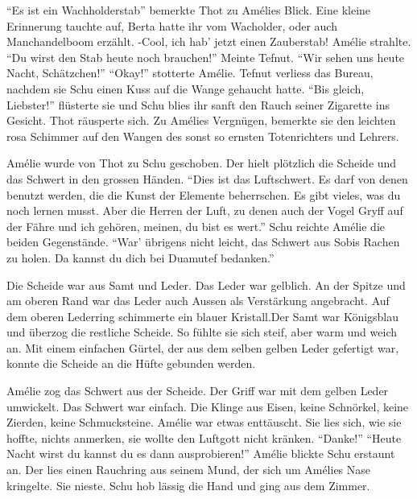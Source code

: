 \documentclass[11pt,titlepage,a5paper]{book}
\begin{document}
 "`Es ist ein Wachholderstab"' bemerkte Thot zu Amélies Blick. Eine kleine Erinnerung tauchte auf, Berta hatte ihr vom Wacholder, oder auch Manchandelboom erzählt. -Cool, ich hab' jetzt einen Zauberstab! Amélie strahlte. "`Du wirst den Stab heute noch brauchen!"' Meinte Tefnut. "`Wir sehen uns heute Nacht, Schätzchen!"' "`Okay!"' stotterte Amélie. Tefnut verliess das Bureau, nachdem sie Schu einen Kuss auf die Wange gehaucht hatte. "`Bis gleich, Liebster!"' flüsterte sie und Schu blies ihr sanft den Rauch seiner Zigarette ins Gesicht. Thot räusperte sich. Zu Amélies Vergnügen, bemerkte sie den leichten rosa Schimmer auf den Wangen des sonst so ernsten Totenrichters und Lehrers.

Amélie wurde von Thot zu Schu geschoben. Der hielt plötzlich die Scheide und das Schwert in den grossen Händen. "`Dies ist das Luftschwert. Es darf von denen benutzt werden, die die Kunst der Elemente beherrschen. Es gibt vieles, was du noch lernen musst. Aber die Herren der Luft, zu denen auch der Vogel Gryff auf der Fähre und ich gehören, meinen, du bist es wert."' Schu reichte Amélie die beiden Gegenstände. "`War' übrigens nicht leicht, das Schwert aus Sobis Rachen zu holen. Da kannst du dich bei Duamutef bedanken."'

Die Scheide war aus Samt und Leder. Das Leder war gelblich. An der Spitze und am oberen Rand war das Leder auch Aussen als Verstärkung angebracht. Auf dem oberen Lederring schimmerte ein blauer Kristall.Der Samt war Königsblau und überzog die restliche Scheide. So fühlte sie sich steif, aber warm und weich an. Mit einem einfachen Gürtel, der aus dem selben gelben Leder gefertigt war, konnte die Scheide an die Hüfte gebunden werden. 

Amélie zog das Schwert aus der Scheide. Der Griff war mit dem gelben Leder umwickelt. Das Schwert war einfach. Die Klinge aus Eisen, keine Schnörkel, keine Zierden, keine Schmucksteine. Amélie war etwas enttäuscht. Sie lies sich, wie sie hoffte, nichts anmerken, sie wollte den Luftgott nicht kränken. "`Danke!"' "`Heute Nacht wirst du kannst du es dann ausprobieren!"' Amélie blickte Schu erstaunt an. Der lies einen Rauchring aus seinem Mund, der sich um Amélies Nase kringelte. Sie nieste. Schu hob lässig die Hand und ging aus dem Zimmer.
\end{document}
